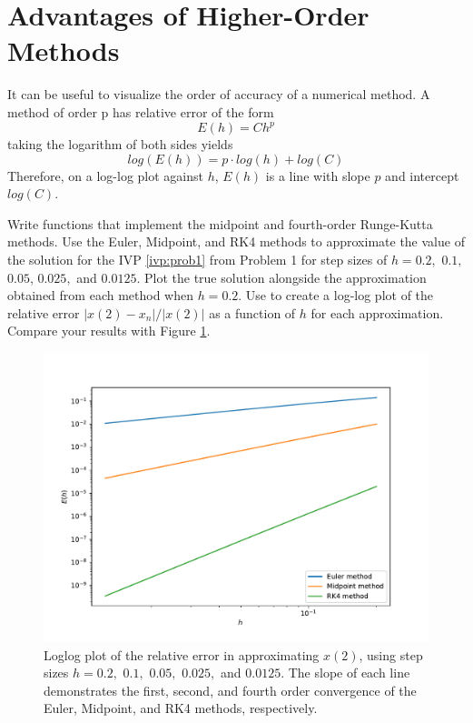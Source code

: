 \section*{Advantages of Higher-Order Methods}
It can be useful to visualize the order of accuracy of a numerical method.
A method of order p has relative error of the form
$$E(h) = Ch^p$$
taking the logarithm of both sides yields
$$log(E(h)) =p \cdot log(h) + log(C)$$
Therefore, on a log-log plot against $h$, $E(h)$ is a line with slope $p$ and intercept $log(C)$.

\begin{problem} Write functions that implement the midpoint and fourth-order Runge-Kutta methods.
Use the Euler, Midpoint, and RK4 methods to approximate the value of the solution for the IVP \eqref{ivp:prob1} from Problem 1 for step sizes of $h = 0.2,$ $ 0.1,$ $0.05 $, $0.025,$ and $0.0125.$
Plot the true solution alongside the approximation obtained from each method when $h=0.2$.
Use  to create a log-log plot of the relative error $|x(2)-x_n|/{|x(2)|}$ as a function of $h$ for each approximation.
Compare your results with Figure \ref{ivp:relative_error}.
\end{problem}

\begin{figure}[h]
\centering
\includegraphics[width=\textwidth]{prob2.pdf}
\caption{Loglog plot of the relative error in approximating $x(2)$, using step sizes $h = 0.2,$ $0.1,$ $0.05,$ $0.025,$ and $0.0125$.
The slope of each line demonstrates the first, second, and fourth order convergence of the Euler, Midpoint, and RK4 methods, respectively.}
\label{ivp:relative_error}
\end{figure}

